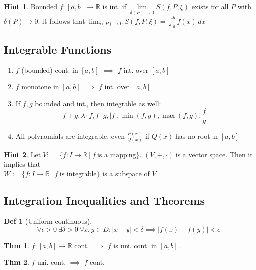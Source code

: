 \documentclass[a4paper, 10pt]{article}
\theoremstyle{definition}
\newtheorem*{theorem}{Thm}
\newtheorem*{definition}{Def}
\newtheorem*{note_wrapper}{Hint}
\theoremstyle{named}
\newenvironment{note}%
    {\begin{mdframed}[style=trick]\begin{note_wrapper}}%
    {\end{note_wrapper}\end{mdframed}}
\newcommand{\R}{\mathbb{R}}
\begin{document}
\begin{note}
    Bounded $f: [a, b] \to \R$ is int. if $\lim\limits_{\delta(P) \to 0} S(f, P, \xi)$ exists for all $P$ with $\delta(P) \to 0$. It follows that \newline $\lim_{\delta(P) \to 0} S(f, P, \xi) = \int_a^b f(x) \,dx$
\end{note}

\subsection{Integrable Functions}
\begin{enumerate}
    \item $f$ (bounded) cont. in $[a, b]$ $\implies$ $f$ int. over $[a, b]$
    \item $f$ monotone in $[a, b]$ $\implies$ $f$ int. over $[a, b]$
    \item If $f, g$ bounded and int., then integrable as well:
    $$f + g, \lambda \cdot f, f \cdot g, |f|, \min(f, g), \max(f,g), \frac{f}{g}$$
    \item All polynomials are integrable, even $\frac{P(x)}{Q(x)}$ if $Q(x)$ has no root in $[a, b]$
\end{enumerate}

\begin{note}
    Let $V: = \{f: I \to \R \ | \ f \ \text{is a mapping}\}$. $(V, +, \cdot)$ is a vector space.
    Then it implies that \\
    $W := \{f: I \to \R \ | \ f \ \text{is integrable}\}$ is a subspace of $V$.
\end{note}

\subsection{Integration Inequalities and Theorems}
\begin{definition}[Uniform continuous]
    $$\forall \epsilon > 0 \ \exists \delta > 0 \ \forall x,y \in D: |x - y| < \delta \implies |f(x) - f(y)| < \epsilon $$
\end{definition}

\begin{theorem}
    $f: [a, b] \to \R$ cont. $\implies$ $f$ is uni. cont. in $[a, b]$.
\end{theorem}

\begin{theorem}
    $f$ uni. cont. $\implies$ $f$ cont.
\end{theorem}
\end{document}

